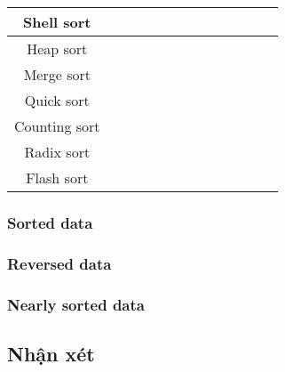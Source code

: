 \begin{table}[!ht]
{\begin{tabular}{|c|c|c|c|c|c|c|c|c|c|c|c|c|}
    Shell sort        &              &             &              &             &              &             &              &             &              &             &              &             \\ \hline
    Heap sort         &              &             &              &             &              &             &              &             &              &             &              &             \\ \hline
    Merge sort        &              &             &              &             &              &             &              &             &              &             &              &             \\ \hline
    Quick sort        &              &             &              &             &              &             &              &             &              &             &              &             \\ \hline
    Counting sort     &              &             &              &             &              &             &              &             &              &             &              &             \\ \hline
    Radix sort        &              &             &              &             &              &             &              &             &              &             &              &             \\ \hline
    Flash sort        &              &             &              &             &              &             &              &             &              &             &              &             \\ \hline
    \end{tabular}
    }
\end{table}
\subsubsection{Sorted data}

\subsubsection{Reversed data}

\subsubsection{Nearly sorted data}

\subsection{Nhận xét}
